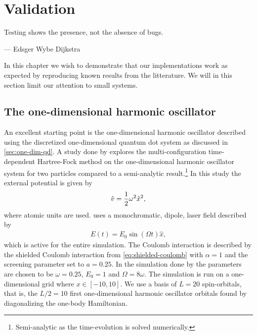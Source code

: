 \chapter{Validation}
    \label{chap:validation}
    \epigraph{Testing shows the presence, not the absence of bugs.}
    {--- Edsger Wybe Dijkstra}

    In this chapter we wish to demonstrate that our implementations work as
    expected by reproducing known results from the litterature.
    We will in this section limit our attention to small systems.

    \section{The one-dimensional harmonic oscillator}
        An excellent starting point is the one-dimensional harmonic
        oscillator described using the discretized one-dimensional quantum dot
        system as discussed in \autoref{sec:one-dim-qd}.
        A study done by \citeauthor{zanghellini_2004}
        \cite{zanghellini_2004, skattum2013time, kristiansen2017time}
        explores the multi-configuration time-dependent Hartree-Fock method
        on the one-dimensional harmonic oscillator system for two particles
        compared to a semi-analytic result.\footnote{%
            Semi-analytic as the time-evolution is solved numerically.
        }
        In this study the external potential is given by
        \begin{align}
            \hat{v} = \frac{1}{2} \omega^2\hat{x}^2,
        \end{align}
        where atomic units are used.
        \citeauthor{zanghellini_2004} uses a monochromatic, dipole, laser field
        described by
        \begin{align}
            E(t) = E_0\sin(\Omega t)\hat{x},
        \end{align}
        which is active for the entire simulation.
        The Coulomb interaction is described by the shielded Coulomb interaction
        from \autoref{eq:shielded-coulomb} with $\alpha = 1$ and the screening
        parameter set to $a = 0.25$.
        In the simulation done by \citeauthor{zanghellini_2004} the parameters
        are chosen to be $\omega = 0.25$, $E_0 = 1$ and $\Omega =
        8\omega$.
        The simulation is run on a one-dimensional grid where $x \in [-10, 10]$.
        We use a basis of $L = 20$ spin-orbitals, that is, the $L / 2 = 10$
        first one-dimensional harmonic oscillator orbitals found by
        diagonalizing the one-body Hamiltonian.

